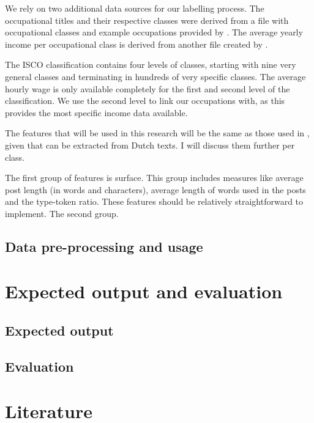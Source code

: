 \documentclass[11pt, a4paper]{article}
\begin{document}
We rely on two additional data sources for our labelling process. The occupational titles and their respective classes were derived from a file with occupational classes and example occupations provided by . The average yearly income per occupational class is derived from another file created by \citet{uurlonen}.

The ISCO classification contains four levels of classes, starting with nine very general classes and terminating in hundreds of very specific classes. The average hourly wage is only available completely for the first and second level of the classification. We use the second level to link our occupations with, as this provides the most specific income data available.

The features that will be used in this research will be the same as those used in \citet{flekova}, given that can be extracted from Dutch texts. I will discuss them further per class.

The first group of features is surface. This group includes measures like average post length (in words and characters), average length of words used in the posts and the type-token ratio. These features should be relatively straightforward to implement. The second group.

\subsection{Data pre-processing and usage}


\section{Expected output and evaluation}
\subsection{Expected output}
\subsection{Evaluation}
\citet{cohen}


\section{Literature}

\end{document}
